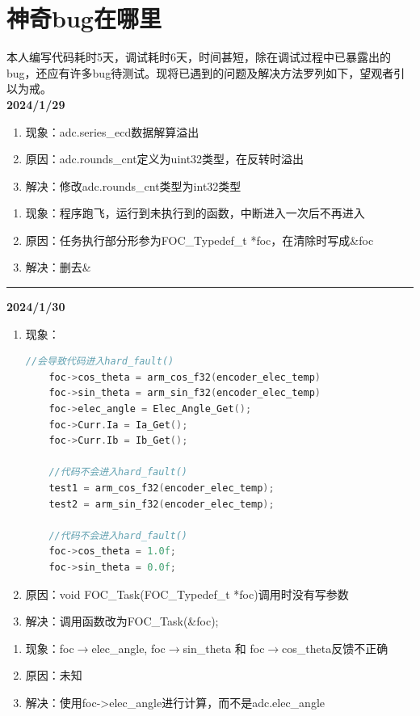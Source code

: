 \documentclass[main.tex]{subfiles}
\begin{document}
\section{神奇bug在哪里}
本人编写代码耗时5天，调试耗时6天，时间甚短，除在调试过程中已暴露出的bug，还应有许多bug待测试。现将已遇到的问题及解决方法罗列如下，望观者引以为戒。\\

\textbf{2024/1/29}
\begin{enumerate}
    \item 现象：adc.series\_ecd数据解算溢出
    \item 原因：adc.rounds\_cnt定义为uint32类型，在反转时溢出
    \item 解决：修改adc.rounds\_cnt类型为int32类型 \\
\end{enumerate}

\begin{enumerate}
    \item 现象：程序跑飞，运行到未执行到的函数，中断进入一次后不再进入
    \item 原因：任务执行部分形参为FOC\_Typedef\_t *foc，在清除时写成\&foc
    \item 解决：删去\&
\end{enumerate}
\rule{\linewidth}{0.3pt}

\textbf{2024/1/30}
\begin{enumerate}
    \item 现象：
    \begin{lstlisting}[language=C]
    //会导致代码进入hard_fault()
    foc->cos_theta = arm_cos_f32(encoder_elec_temp)
    foc->sin_theta = arm_sin_f32(encoder_elec_temp)
    foc->elec_angle = Elec_Angle_Get();
    foc->Curr.Ia = Ia_Get();
    foc->Curr.Ib = Ib_Get();
    
    //代码不会进入hard_fault()
    test1 = arm_cos_f32(encoder_elec_temp);
    test2 = arm_sin_f32(encoder_elec_temp);
    
    //代码不会进入hard_fault()
    foc->cos_theta = 1.0f;
    foc->sin_theta = 0.0f;
    \end{lstlisting}
    \item 原因：void FOC\_Task(FOC\_Typedef\_t *foc)调用时没有写参数
    \item 解决：调用函数改为FOC\_Task(\&foc);\\
\end{enumerate}

\begin{enumerate}
    \item 现象：foc$\rightarrow$elec\_angle, foc$\rightarrow$sin\_theta 和 foc$\rightarrow$cos\_theta反馈不正确
    \item 原因：未知
    \item 解决：使用foc->elec\_angle进行计算，而不是adc.elec\_angle \\
\end{enumerate}
\end{document}
